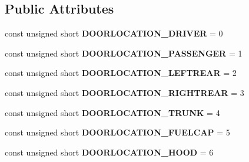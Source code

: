 \subsection*{Public Attributes}
\begin{DoxyCompactItemize}
\item 
\hypertarget{interfaceVehicle_1_1DoorStatus_a38271af429e72dade6463576bd5a1b45}{const unsigned short {\bfseries D\-O\-O\-R\-L\-O\-C\-A\-T\-I\-O\-N\-\_\-\-D\-R\-I\-V\-E\-R} = 0}\label{interfaceVehicle_1_1DoorStatus_a38271af429e72dade6463576bd5a1b45}

\item 
\hypertarget{interfaceVehicle_1_1DoorStatus_a730b10d383c2b96910be88263af4e7c5}{const unsigned short {\bfseries D\-O\-O\-R\-L\-O\-C\-A\-T\-I\-O\-N\-\_\-\-P\-A\-S\-S\-E\-N\-G\-E\-R} = 1}\label{interfaceVehicle_1_1DoorStatus_a730b10d383c2b96910be88263af4e7c5}

\item 
\hypertarget{interfaceVehicle_1_1DoorStatus_abcd10c7d5b88ec00cb037dfb6a7aa42a}{const unsigned short {\bfseries D\-O\-O\-R\-L\-O\-C\-A\-T\-I\-O\-N\-\_\-\-L\-E\-F\-T\-R\-E\-A\-R} = 2}\label{interfaceVehicle_1_1DoorStatus_abcd10c7d5b88ec00cb037dfb6a7aa42a}

\item 
\hypertarget{interfaceVehicle_1_1DoorStatus_a220fe62e359b2a7309ce5de67a759756}{const unsigned short {\bfseries D\-O\-O\-R\-L\-O\-C\-A\-T\-I\-O\-N\-\_\-\-R\-I\-G\-H\-T\-R\-E\-A\-R} = 3}\label{interfaceVehicle_1_1DoorStatus_a220fe62e359b2a7309ce5de67a759756}

\item 
\hypertarget{interfaceVehicle_1_1DoorStatus_a9b9e90342f5731f6e4596039b6587aae}{const unsigned short {\bfseries D\-O\-O\-R\-L\-O\-C\-A\-T\-I\-O\-N\-\_\-\-T\-R\-U\-N\-K} = 4}\label{interfaceVehicle_1_1DoorStatus_a9b9e90342f5731f6e4596039b6587aae}

\item 
\hypertarget{interfaceVehicle_1_1DoorStatus_a9d1ce5a56ce0a2bb750056a81c12a4e9}{const unsigned short {\bfseries D\-O\-O\-R\-L\-O\-C\-A\-T\-I\-O\-N\-\_\-\-F\-U\-E\-L\-C\-A\-P} = 5}\label{interfaceVehicle_1_1DoorStatus_a9d1ce5a56ce0a2bb750056a81c12a4e9}

\item 
\hypertarget{interfaceVehicle_1_1DoorStatus_a626e2825d83fd2c55941b880a9ba265f}{const unsigned short {\bfseries D\-O\-O\-R\-L\-O\-C\-A\-T\-I\-O\-N\-\_\-\-H\-O\-O\-D} = 6}\label{interfaceVehicle_1_1DoorStatus_a626e2825d83fd2c55941b880a9ba265f}


\end{DoxyCompactItemize}
